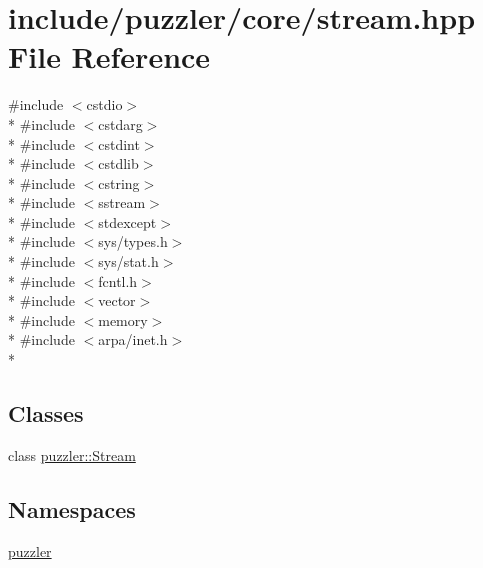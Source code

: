 \hypertarget{a00123}{}\section{include/puzzler/core/stream.hpp File Reference}
\label{a00123}
{\ttfamily \#include $<$cstdio$>$}\\*
{\ttfamily \#include $<$cstdarg$>$}\\*
{\ttfamily \#include $<$cstdint$>$}\\*
{\ttfamily \#include $<$cstdlib$>$}\\*
{\ttfamily \#include $<$cstring$>$}\\*
{\ttfamily \#include $<$sstream$>$}\\*
{\ttfamily \#include $<$stdexcept$>$}\\*
{\ttfamily \#include $<$sys/types.\+h$>$}\\*
{\ttfamily \#include $<$sys/stat.\+h$>$}\\*
{\ttfamily \#include $<$fcntl.\+h$>$}\\*
{\ttfamily \#include $<$vector$>$}\\*
{\ttfamily \#include $<$memory$>$}\\*
{\ttfamily \#include $<$arpa/inet.\+h$>$}\\*
\subsection*{Classes}
\begin{DoxyCompactItemize}
\item 
class \hyperlink{a00031}{puzzler\+::\+Stream}
\end{DoxyCompactItemize}
\subsection*{Namespaces}
\begin{DoxyCompactItemize}
\item 
 \hyperlink{a00145}{puzzler}
\end{DoxyCompactItemize}
